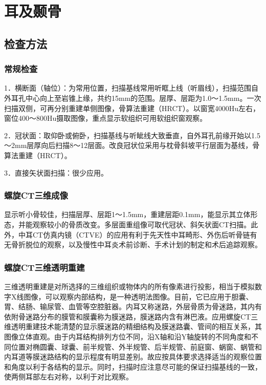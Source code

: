 \chapter{耳及颞骨}

\section{检查方法}

\subsection{常规检查}

1．横断面（轴位）：为常用位置，扫描基线常用听眶上线（听眉线），扫描范围自外耳孔中心向上至岩锥上缘，共约15mm的范围。层厚、层距为1.0～1.5mm。一次扫描双侧，可再分别重建单侧图像，骨算法重建（HRCT）。以窗宽4000Hu左右，窗位400～800Hu摄取图像，重点显示软组织可用软组织窗观察。

2．冠状面：取仰卧或俯卧，扫描基线与听眦线大致垂直，自外耳孔前缘开始以1.5～2mm层厚向后扫描8～12层面。改良冠状位采用与枕骨斜坡平行层面为基线，骨算法重建（HRCT）。

3．直接矢状面扫描：很少应用。

\subsection{螺旋CT三维成像}

显示听小骨较佳，扫描层厚、层距1～1.5mm，重建层距0.1mm，能显示其立体形态，并能观察较小的骨质改变。多层面重组像可取代冠状、斜矢状面CT扫描。此外，中耳CT仿真内镜（CTVE）的应用有利于先天性中耳畸形、外伤后听骨链有无骨折脱位的观察，以及慢性中耳炎术前诊断、手术计划的制定和术后追踪观察。

\subsection{螺旋CT三维透明重建}

三维透明重建是对所选择的三维组织或物体内的所有像素进行投影，相当于模拟数字X线图像，可以观察内部结构，是一种透明法图像。目前，它已应用于胆囊、胃、结肠、输尿管、血管等空腔脏器。内耳又称迷路，外层骨质为骨迷路，其内有依附骨迷路分布的膜管和膜囊称为膜迷路，膜迷路内含有淋巴液。应用螺旋CT三维透明重建技术能清楚的显示膜迷路的精细结构及膜迷路囊、管间的相互关系，其图像立体直观。由于内耳结构排列方位不同，沿X轴和沿Y轴旋转的不同角度和不同位置对椭圆囊、球囊、前半规管、外半规管、后半规管、前庭窗、蜗窗、蜗管和内耳道等膜迷路结构的显示程度有明显差别。故应按具体要求选择适当的观察位置和角度以利于各结构的显示。同时，扫描时应注意尽可能的保证扫描基线的一致，使两侧耳部左右对称，以利于对比观察。

